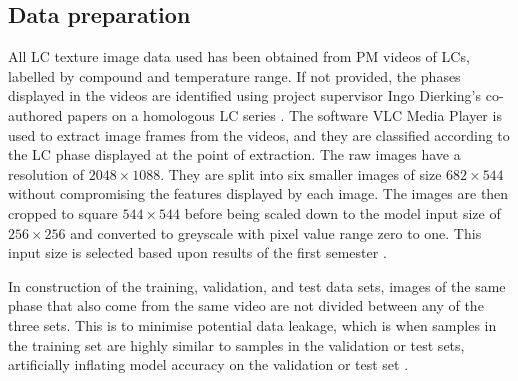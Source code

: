 \documentclass[12pt]{article}
\begin{document}
\subsection{Data preparation}
All LC texture image data used has been obtained from PM videos of LCs, labelled by compound and temperature range. If not provided, the phases displayed in the videos are identified using project supervisor Ingo Dierking's co-authored papers on a homologous LC series \cite{Dierking94, Schacht95}. The software VLC Media Player \cite{VideoLan06} is used to extract image frames from the videos, and they are classified  according to the LC phase displayed at the point of extraction. The raw images have a resolution of $2048\times1088$. They are split into six smaller images of size $682\times544$ without compromising the features displayed by each image. The images are then cropped to square $544\times544$ before being scaled down to the model input size of $256\times256$ and converted to greyscale with pixel value range zero to one. This input size is selected based upon results of the first semester \cite{Heaton20}.

In construction of the training, validation, and test data sets, images of the same phase that also come from the same video are not divided between any of the three sets. This is to minimise potential data leakage, which is when samples in the training set are highly similar to samples in the validation or test sets, artificially inflating model accuracy on the validation or test set \cite{Kaufman12}.
\end{document}

